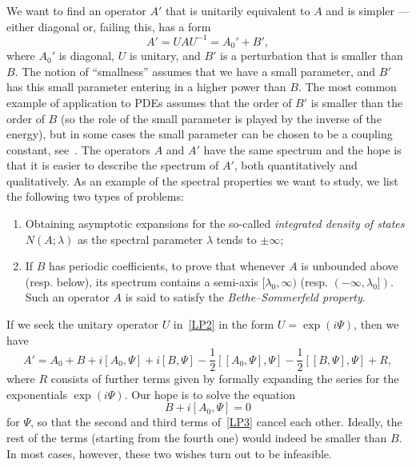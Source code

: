 \documentclass[AHL,Unicode,longabstracts,published]{cedram}
\begin{document}
We want to find an operator $A'$ that is unitarily equivalent to $A$ and is simpler --- either diagonal or, failing this, has a form
\begin{equation}\label{LP2}
A' = U A U^{-1} = A_0' + B',
\end{equation}
where $A_0'$ is diagonal, $U$ is unitary, and $B'$ is a perturbation that is smaller than $B$. The notion of ``smallness'' assumes that we have a small parameter, and $B'$ has this small parameter entering in a higher power than $B$. The most common example of application to PDEs assumes that the order of $B'$ is smaller than the order of $B$ (so the role of the small parameter is played by the inverse of the energy), but in some cases the small parameter can be chosen to be a coupling constant, see~\cite{ParSht2019}. The operators $A$ and $A'$ have the same spectrum and the hope is that it is easier to describe the spectrum of $A'$, both quantitatively and qualitatively. As an example of the spectral properties we want to study, we list the following two types of problems:
\begin{enumerate}
\item Obtaining asymptotic expansions for the so-called \emph{integrated density of states} $N(A;\lambda)$ as the spectral parameter $\lambda$ tends to $\pm \infty$;
\item If $B$ has periodic coefficients, to prove that whenever $A$ is unbounded above (resp. below), its spectrum contains a semi-axis $[\lambda_0,\infty)$ (resp. $(-\infty,\lambda_0])$. Such an operator $A$ is said to satisfy the
\emph{Bethe--Sommerfeld property}.
\end{enumerate}

If we seek the unitary operator $U$ in~\eqref{LP2} in the form $U=\exp(i \Psi)$, then we have
\begin{equation}\label{LP3}
A' = A_0 + B+i [A_0,\Psi] + i[B,\Psi]-\frac12 [[A_0,\Psi],\Psi]-\frac12 [[B,\Psi],\Psi]+R,
\end{equation}
where $R$ consists of further terms given by formally expanding the series for the exponentials $\exp(i\Psi)$. Our hope is to solve the equation
\begin{equation}\label{LP4}
B + i[A_0,\Psi]=0
\end{equation}
for $\Psi$, so that the second and third terms of~\eqref{LP3} cancel each other. Ideally, the rest of the terms (starting from the fourth one) would indeed be smaller than $B$. In most cases, however, these two wishes turn out to be infeasible.
\end{document}
